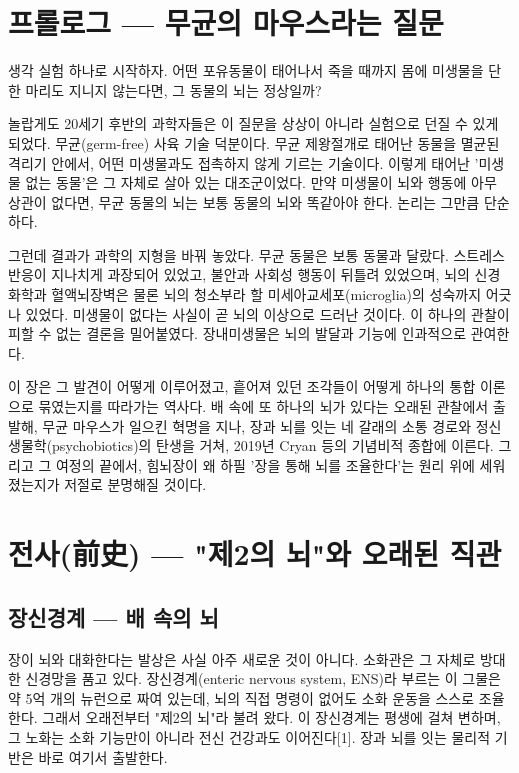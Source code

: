 \documentclass[12pt,oneside]{book}
\begin{document}
\section{프롤로그 — 무균의 마우스라는 질문}

생각 실험 하나로 시작하자. 어떤 포유동물이 태어나서 죽을 때까지 몸에 미생물을 단 한 마리도 지니지 않는다면, 그 동물의 뇌는 정상일까?

놀랍게도 20세기 후반의 과학자들은 이 질문을 상상이 아니라 실험으로 던질 수 있게 되었다. 무균(germ-free) 사육 기술 덕분이다. 무균 제왕절개로 태어난 동물을 멸균된 격리기 안에서, 어떤 미생물과도 접촉하지 않게 기르는 기술이다. 이렇게 태어난 '미생물 없는 동물'은 그 자체로 살아 있는 대조군이었다. 만약 미생물이 뇌와 행동에 아무 상관이 없다면, 무균 동물의 뇌는 보통 동물의 뇌와 똑같아야 한다. 논리는 그만큼 단순하다.

그런데 결과가 과학의 지형을 바꿔 놓았다. 무균 동물은 보통 동물과 달랐다. 스트레스 반응이 지나치게 과장되어 있었고, 불안과 사회성 행동이 뒤틀려 있었으며, 뇌의 신경화학과 혈액뇌장벽은 물론 뇌의 청소부라 할 미세아교세포(microglia)의 성숙까지 어긋나 있었다. 미생물이 없다는 사실이 곧 뇌의 이상으로 드러난 것이다. 이 하나의 관찰이 피할 수 없는 결론을 밀어붙였다. 장내미생물은 뇌의 발달과 기능에 인과적으로 관여한다.

이 장은 그 발견이 어떻게 이루어졌고, 흩어져 있던 조각들이 어떻게 하나의 통합 이론으로 묶였는지를 따라가는 역사다. 배 속에 또 하나의 뇌가 있다는 오래된 관찰에서 출발해, 무균 마우스가 일으킨 혁명을 지나, 장과 뇌를 잇는 네 갈래의 소통 경로와 정신생물학(psychobiotics)의 탄생을 거쳐, 2019년 Cryan 등의 기념비적 종합에 이른다. 그리고 그 여정의 끝에서, 힘뇌장이 왜 하필 '장을 통해 뇌를 조율한다'는 원리 위에 세워졌는지가 저절로 분명해질 것이다.

\section{전사(前史) — "제2의 뇌"와 오래된 직관}

\subsection{장신경계 — 배 속의 뇌}

장이 뇌와 대화한다는 발상은 사실 아주 새로운 것이 아니다. 소화관은 그 자체로 방대한 신경망을 품고 있다. 장신경계(enteric nervous system, ENS)라 부르는 이 그물은 약 5억 개의 뉴런으로 짜여 있는데, 뇌의 직접 명령이 없어도 소화 운동을 스스로 조율한다. 그래서 오래전부터 "제2의 뇌"라 불려 왔다. 이 장신경계는 평생에 걸쳐 변하며, 그 노화는 소화 기능만이 아니라 전신 건강과도 이어진다[1]. 장과 뇌를 잇는 물리적 기반은 바로 여기서 출발한다.
\end{document}
